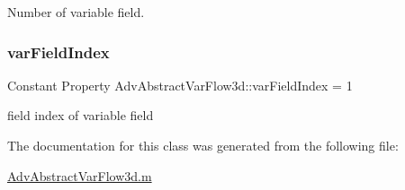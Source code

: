 Number of variable field. 

\mbox{\label{class_adv_abstract_var_flow3d_a385e2d69864aaff7936b3971724a858f}} 
\subsubsection{\texorpdfstring{var\+Field\+Index}{varFieldIndex}}
{\footnotesize\ttfamily Constant Property Adv\+Abstract\+Var\+Flow3d\+::var\+Field\+Index = 1}



field index of variable field 



The documentation for this class was generated from the following file\+:\begin{DoxyCompactItemize}
\item 
\hyperlink{_adv_abstract_var_flow3d_8m}{Adv\+Abstract\+Var\+Flow3d.\+m}\end{DoxyCompactItemize}
